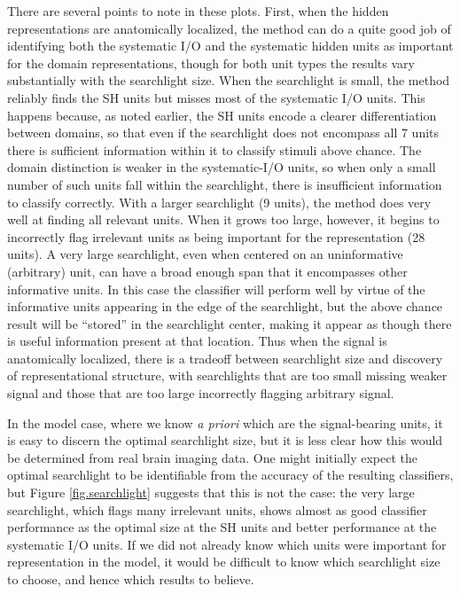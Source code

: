There are several points to note in these plots. First, when the hidden representations are anatomically localized, the method can do a quite good job of identifying both the systematic I/O and the systematic hidden units as important for the domain representations, though for both unit types the results vary substantially with the searchlight size. When the searchlight is small, the method reliably finds the SH units but misses most of the systematic I/O units. This happens because, as noted earlier, the SH units encode a clearer differentiation between domains, so that even if the searchlight does not encompass all 7 units there is sufficient information within it to classify stimuli above chance. The domain distinction is weaker in the systematic-I/O units, so when only a small number of such units fall within the searchlight, there is insufficient information to classify correctly. With a larger searchlight (9 units), the method does very well at finding all relevant units.  When it grows too large, however, it begins to incorrectly flag irrelevant units as being important for the representation (28 units). A very large searchlight, even when centered on an uninformative (arbitrary) unit, can have a broad enough span that it encompasses other informative units. In this case the classifier will perform well by virtue of the informative units appearing in the edge of the searchlight, but the above chance result will be ``stored'' in the searchlight center, making it appear as though there is useful information present at that location. Thus when the signal is anatomically localized, there is a tradeoff between searchlight size and discovery of representational structure, with searchlights that are too small missing weaker signal and those that are too large incorrectly flagging arbitrary signal.

In the model case, where we know {\em a priori} which are the signal-bearing units, it is easy to discern the optimal searchlight size, but it is less clear how this would be determined from real brain imaging data. One might initially expect the optimal searchlight to be identifiable from the accuracy of the resulting classifiers, but Figure \ref{fig.searchlight} suggests that this is not the case: the very large searchlight, which flags many irrelevant units, shows almost as good classifier performance as the optimal size at the SH units and better performance at the systematic I/O units. If we did not already know which units were important for representation in the model, it would be difficult to know which searchlight size to choose, and hence which results to believe.

